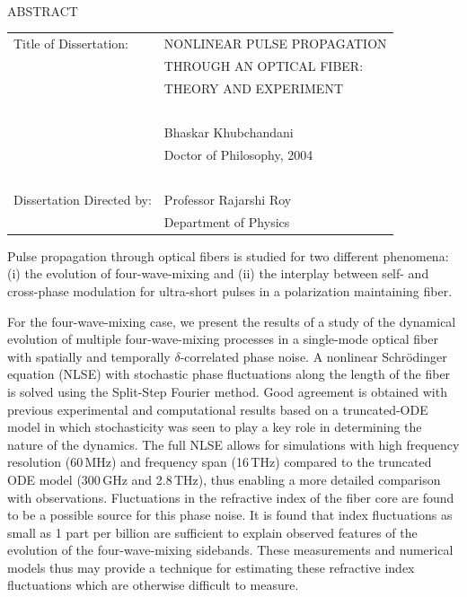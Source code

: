 
\hbox{\ } \vspace{.7in}
\renewcommand{\baselinestretch}{1}
\small \normalsize

\begin{center}
\large{{ABSTRACT}}

\vspace{3em}

\end{center}
\hspace{-.15in}
\begin{tabular}{ll}
Title of Dissertation:    & {\large  NONLINEAR PULSE PROPAGATION }\\
&                     {\large  THROUGH AN OPTICAL FIBER:} \\
&                     {\large  THEORY AND EXPERIMENT} \\
\ \\
&                          {\large  Bhaskar Khubchandani} \\
&                           {\large Doctor of Philosophy, 2004} \\
\ \\
Dissertation Directed by: & {\large  Professor Rajarshi Roy} \\
&               {\large  Department of Physics } \\
\end{tabular}

\vspace{3em}

\renewcommand{\baselinestretch}{2}
\large \normalsize

Pulse propagation through optical
fibers is studied for two different phenomena: (i) the evolution
of four-wave-mixing and (ii) the interplay between self- and
cross-phase modulation for ultra-short pulses in a polarization
maintaining fiber.

For the four-wave-mixing case, we present the results of a study
of the dynamical evolution of multiple four-wave-mixing processes
in a single-mode optical fiber with spatially and temporally
$\delta$-correlated phase noise. A nonlinear Schr\"odinger
equation (NLSE) with stochastic phase fluctuations along the
length of the fiber is solved using the Split-Step Fourier method.
Good agreement is obtained with previous experimental and
computational results based on a truncated-ODE model in which
stochasticity was seen to play a key role in determining the
nature of the dynamics. The full NLSE allows for simulations with
high frequency resolution (60\,MHz) and frequency span (16\,THz)
compared to the truncated ODE model (300\,GHz and 2.8\,THz), thus
enabling a more detailed comparison with observations.
Fluctuations in the refractive index of the fiber core are found
to be a possible source for this phase noise. It is found that
index fluctuations as small as 1 part per billion are sufficient
to explain observed features of the evolution of the
four-wave-mixing sidebands. These measurements and numerical
models thus may provide a technique for estimating these
refractive index fluctuations which are otherwise difficult to
measure.

